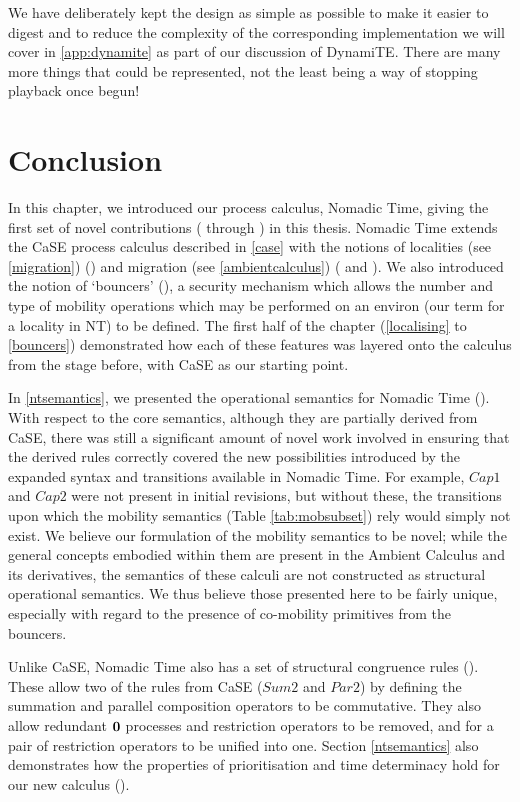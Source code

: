 We have deliberately kept the design as simple as possible to make it
easier to digest and to reduce the complexity of the corresponding
implementation we will cover in \ref{app:dynamite} as part of our
discussion of DynamiTE.  There are many more things that could be
represented, not the least being a way of stopping playback once
begun!

\section{Conclusion}

In this chapter, we introduced our process calculus, Nomadic Time,
giving the first set of novel contributions ( through
) in this thesis.  Nomadic Time extends the CaSE process
calculus described in \ref{case} with the notions of localities (see
\ref{migration}) () and migration (see
\ref{ambientcalculus}) ( and ).  We also
introduced the notion of `bouncers' (), a security mechanism
which allows the number and type of mobility operations which may be
performed on an environ (our term for a locality in NT) to be defined.
The first half of the chapter (\ref{localising} to \ref{bouncers})
demonstrated how each of these features was layered onto the calculus
from the stage before, with CaSE as our starting point.

In \ref{ntsemantics}, we presented the operational semantics for
Nomadic Time ().  With respect to the core semantics,
although they are partially derived from CaSE, there was still a
significant amount of novel work involved in ensuring that the derived
rules correctly covered the new possibilities introduced by the
expanded syntax and transitions available in Nomadic Time.  For
example, $Cap1$ and $Cap2$ were not present in initial revisions, but
without these, the transitions upon which the mobility semantics
(Table \ref{tab:mobsubset}) rely would simply not exist.  We believe
our formulation of the mobility semantics to be novel; while the
general concepts embodied within them are present in the Ambient
Calculus and its derivatives, the semantics of these calculi are not
constructed as structural operational semantics.  We thus believe
those presented here to be fairly unique, especially with regard to
the presence of co-mobility primitives from the bouncers.

Unlike CaSE, Nomadic Time also has a set of structural congruence
rules ().  These allow two of the rules from CaSE ($Sum2$
and $Par2$) by defining the summation and parallel composition
operators to be commutative.  They also allow redundant $\textbf{0}$
processes and restriction operators to be removed, and for a pair of
restriction operators to be unified into one.  Section
\ref{ntsemantics} also demonstrates how the properties of
prioritisation and time determinacy hold for our new calculus
().

